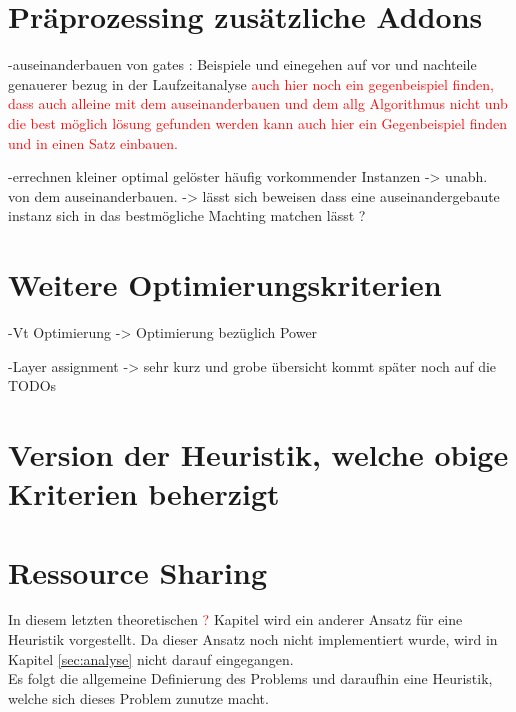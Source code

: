 \documentclass[11pt, a4paper, german]{article}
\begin{document}
\section{Präprozessing  zusätzliche Addons}
-auseinanderbauen von gates : Beispiele und einegehen auf vor und nachteile genauerer bezug in der Laufzeitanalyse \textcolor{red}{auch hier noch ein gegenbeispiel finden, dass auch alleine mit dem auseinanderbauen und dem allg Algorithmus nicht unb die best möglich lösung gefunden werden kann auch hier ein Gegenbeispiel finden und in einen Satz einbauen.}
	
	-errechnen kleiner optimal gelöster häufig vorkommender Instanzen -> unabh. von dem auseinanderbauen.  -> lässt sich beweisen dass eine auseinandergebaute instanz sich in das bestmögliche Machting matchen lässt ? 
	

\section{Weitere Optimierungskriterien}
	-Vt Optimierung -> Optimierung bezüglich Power
	
	-Layer assignment -> sehr kurz und grobe übersicht kommt später noch auf die TODOs 
	
	
\section{Version der Heuristik, welche obige Kriterien beherzigt}
\section{Ressource Sharing}
In diesem letzten theoretischen \textcolor{red}{?} Kapitel wird ein anderer Ansatz für eine Heuristik vorgestellt. Da dieser Ansatz noch nicht implementiert wurde, wird in Kapitel \ref{sec:analyse} nicht darauf eingegangen.\\
Es folgt die allgemeine Definierung des Problems und daraufhin eine Heuristik, welche sich dieses Problem zunutze macht.\\
\end{document}
